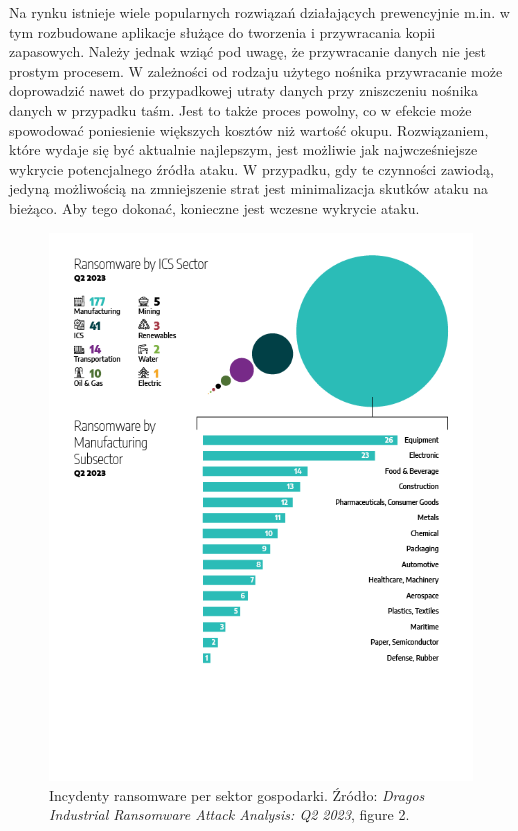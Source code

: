  Na rynku istnieje wiele popularnych rozwiązań działających prewencyjnie m.in. w tym rozbudowane aplikacje służące do tworzenia i przywracania kopii zapasowych. Należy jednak wziąć pod uwagę, że przywracanie danych nie jest prostym procesem. W zależności od rodzaju użytego nośnika przywracanie może doprowadzić nawet do przypadkowej utraty danych przy zniszczeniu nośnika danych w przypadku taśm. Jest to także proces powolny, co w efekcie może spowodować poniesienie większych kosztów niż wartość okupu.
 \newline
 Rozwiązaniem, które wydaje się być aktualnie najlepszym, jest możliwie jak najwcześniejsze wykrycie potencjalnego źródła ataku. W przypadku, gdy te czynności zawiodą, jedyną możliwością na zmniejszenie strat jest minimalizacja skutków ataku na bieżąco. Aby tego dokonać, konieczne jest wczesne wykrycie ataku.
 
\begin{figure}[H]
\centering
\includegraphics[width=0.6\linewidth]{rysunki/attackbysector.png}
\caption{Incydenty ransomware per sektor gospodarki. Źródło: \emph{Dragos Industrial Ransomware Attack Analysis: Q2 2023}, figure 2.}
\label{fig:enter-label}
\end{figure}
 


